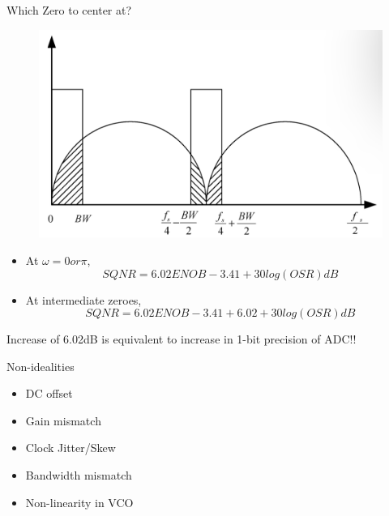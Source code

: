 \documentclass{beamer}
\begin{document}
\begin{frame}{Which Zero to center at?}
\begin{figure}
	\includegraphics[scale=0.3]{./figs/Bwplot.png}
\end{figure}
\vspace{-0.5cm}
\begin{itemize}
	\item At $\omega = 0 or \pi$,
	\vspace{-0.5cm}
	\begin{equation*}
		SQNR = 6.02ENOB - 3.41 + 30log(OSR)dB
	\end{equation*}
	\vspace{-1cm}
	\item At intermediate zeroes,
	\vspace{-0.6cm}
	\begin{equation*}
		SQNR = 6.02ENOB - 3.41 + 6.02 + 30log(OSR)dB
	\end{equation*}
	\vspace{-1.3cm}
\end{itemize}
	Increase of 6.02dB is equivalent to increase in 1-bit precision of ADC!!
\end{frame}

\begin{frame}{Non-idealities}
	\begin{itemize}
		\item DC offset
		\item Gain mismatch
		\item Clock Jitter/Skew
		\item Bandwidth mismatch
		\item Non-linearity in VCO
	\end{itemize}
\end{frame}
\end{document}
